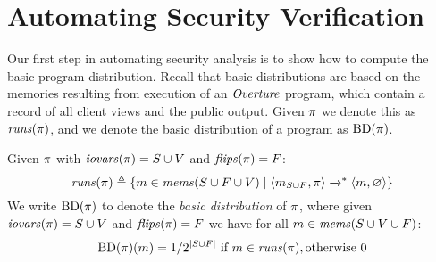 \section{Automating Security Verification}
\label{section-automation}



Our first step in automating security analysis is to show how to
compute the basic program distribution. Recall that basic
distributions are based on the memories resulting from execution of an
$\mathit{Overture}$ program, which contain a record of all client views and the
public output.  Given $\pi$ we denote this as $\mathit{runs}(\pi)$, and we
denote the basic distribution of a program as $\mathrm{BD}(\pi)$.
\begin{definition}
  Given $\pi$ with $\mathit{iovars}(\pi) = S \cup V$ and $\mathit{flips}(\pi) = F$:
  $$
  \mathit{runs}(\pi) \triangleq \{ m \in \mathit{mems}(S\cup F \cup V) \mid \langle m_{S \cup F},\pi \rangle \xrightarrow{}^{*} \langle m,\varnothing \rangle \}
  $$
  We write $\mathrm{BD}(\pi)$ to denote the \emph{basic distribution} of
  $\pi$, where given $\mathit{iovars}(\pi) = S \cup V$ and $\mathit{flips}(\pi) = F$
  we have for all $m \in \mathit{mems}(S \cup V \cup F)$:
  $$
  \mathrm{BD}(\pi)(m) =  1 / 2^{|S\cup F|} \ \text{if}\ m \in \mathit{runs}(\pi), \text{otherwise}\ 0
  $$
\end{definition}

